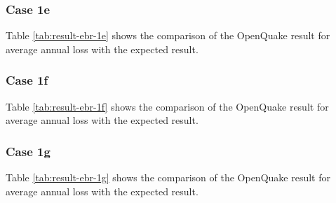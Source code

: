 \subsubsection{Case 1e}


Table \ref{tab:result-ebr-1e} shows the comparison of the OpenQuake result for average annual loss with the expected result.

\subsubsection{Case 1f}


Table \ref{tab:result-ebr-1f} shows the comparison of the OpenQuake result for average annual loss with the expected result.

\subsubsection{Case 1g}


Table \ref{tab:result-ebr-1g} shows the comparison of the OpenQuake result for average annual loss with the expected result.

